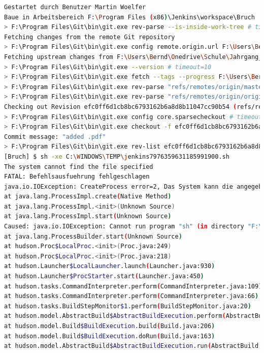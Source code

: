 \begin{lstlisting}[language=bash]
Gestartet durch Benutzer Martin Woelfer
Baue in Arbeitsbereich F:\Program Files (x86)\Jenkins\workspace\Bruch
> F:\Program Files\Git\bin\git.exe rev-parse --is-inside-work-tree # timeout=10
Fetching changes from the remote Git repository
> F:\Program Files\Git\bin\git.exe config remote.origin.url F:\Users\Bernd\Onedrive\Schule\Jahrgang_4\SEW # timeout=10
Fetching upstream changes from F:\Users\Bernd\Onedrive\Schule\Jahrgang_4\SEW
> F:\Program Files\Git\bin\git.exe --version # timeout=10
> F:\Program Files\Git\bin\git.exe fetch --tags --progress F:\Users\Bernd\Onedrive\Schule\Jahrgang_4\SEW +refs/heads/*:refs/remotes/origin/*
> F:\Program Files\Git\bin\git.exe rev-parse "refs/remotes/origin/master^{commit}" # timeout=10
> F:\Program Files\Git\bin\git.exe rev-parse "refs/remotes/origin/origin/master^{commit}" # timeout=10
Checking out Revision efc0ff6d1cb8bc6793162b6a8d8b11047cc90b54 (refs/remotes/origin/master)
> F:\Program Files\Git\bin\git.exe config core.sparsecheckout # timeout=10
> F:\Program Files\Git\bin\git.exe checkout -f efc0ff6d1cb8bc6793162b6a8d8b11047cc90b54
Commit message: "added .pdf"
> F:\Program Files\Git\bin\git.exe rev-list efc0ff6d1cb8bc6793162b6a8d8b11047cc90b54 # timeout=10
[Bruch] $ sh -xe C:\WINDOWS\TEMP\jenkins7976359631185991900.sh
The system cannot find the file specified
FATAL: Befehlsausfuehrung fehlgeschlagen
java.io.IOException: CreateProcess error=2, Das System kann die angegebene Datei nicht finden
at java.lang.ProcessImpl.create(Native Method)
at java.lang.ProcessImpl.<init>(Unknown Source)
at java.lang.ProcessImpl.start(Unknown Source)
Caused: java.io.IOException: Cannot run program "sh" (in directory "F:\Program Files (x86)\Jenkins\workspace\Bruch"): CreateProcess error=2, Das System kann die angegebene Datei nicht finden
at java.lang.ProcessBuilder.start(Unknown Source)
at hudson.Proc$LocalProc.<init>(Proc.java:249)
at hudson.Proc$LocalProc.<init>(Proc.java:218)
at hudson.Launcher$LocalLauncher.launch(Launcher.java:930)
at hudson.Launcher$ProcStarter.start(Launcher.java:450)
at hudson.tasks.CommandInterpreter.perform(CommandInterpreter.java:109)
at hudson.tasks.CommandInterpreter.perform(CommandInterpreter.java:66)
at hudson.tasks.BuildStepMonitor$1.perform(BuildStepMonitor.java:20)
at hudson.model.AbstractBuild$AbstractBuildExecution.perform(AbstractBuild.java:736)
at hudson.model.Build$BuildExecution.build(Build.java:206)
at hudson.model.Build$BuildExecution.doRun(Build.java:163)
at hudson.model.AbstractBuild$AbstractBuildExecution.run(AbstractBuild.java:496)

\end{lstlisting}
